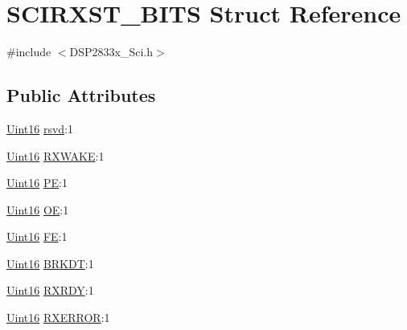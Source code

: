 \hypertarget{struct_s_c_i_r_x_s_t___b_i_t_s}{}\section{S\+C\+I\+R\+X\+S\+T\+\_\+\+B\+I\+T\+S Struct Reference}
\label{struct_s_c_i_r_x_s_t___b_i_t_s}


{\ttfamily \#include $<$D\+S\+P2833x\+\_\+\+Sci.\+h$>$}

\subsection*{Public Attributes}
\begin{DoxyCompactItemize}
\item 
\hyperlink{_d_s_p2833x___device_8h_a59a9f6be4562c327cbfb4f7e8e18f08b}{Uint16} \hyperlink{struct_s_c_i_r_x_s_t___b_i_t_s_a94e41dd6ba5e5be3d63c52db6e9a5fa5}{rsvd}\+:1
\item 
\hyperlink{_d_s_p2833x___device_8h_a59a9f6be4562c327cbfb4f7e8e18f08b}{Uint16} \hyperlink{struct_s_c_i_r_x_s_t___b_i_t_s_a924f49b75a354701a7b1aa0914b727dd}{R\+X\+W\+A\+K\+E}\+:1
\item 
\hyperlink{_d_s_p2833x___device_8h_a59a9f6be4562c327cbfb4f7e8e18f08b}{Uint16} \hyperlink{struct_s_c_i_r_x_s_t___b_i_t_s_a073eb89f2348c361ea8411127510f6ee}{P\+E}\+:1
\item 
\hyperlink{_d_s_p2833x___device_8h_a59a9f6be4562c327cbfb4f7e8e18f08b}{Uint16} \hyperlink{struct_s_c_i_r_x_s_t___b_i_t_s_aff0f70440e0c71c2de5fc2c937f11b83}{O\+E}\+:1
\item 
\hyperlink{_d_s_p2833x___device_8h_a59a9f6be4562c327cbfb4f7e8e18f08b}{Uint16} \hyperlink{struct_s_c_i_r_x_s_t___b_i_t_s_aced19690707a651351d981abb21bf510}{F\+E}\+:1
\item 
\hyperlink{_d_s_p2833x___device_8h_a59a9f6be4562c327cbfb4f7e8e18f08b}{Uint16} \hyperlink{struct_s_c_i_r_x_s_t___b_i_t_s_ab3f2cd112a18adfd3242f5cb550fea60}{B\+R\+K\+D\+T}\+:1
\item 
\hyperlink{_d_s_p2833x___device_8h_a59a9f6be4562c327cbfb4f7e8e18f08b}{Uint16} \hyperlink{struct_s_c_i_r_x_s_t___b_i_t_s_a8a137e6a747464d144dc0a6a39f42143}{R\+X\+R\+D\+Y}\+:1
\item 
\hyperlink{_d_s_p2833x___device_8h_a59a9f6be4562c327cbfb4f7e8e18f08b}{Uint16} \hyperlink{struct_s_c_i_r_x_s_t___b_i_t_s_a2bd58567c90a377aa8f7261f7fe35275}{R\+X\+E\+R\+R\+O\+R}\+:1
\end{DoxyCompactItemize}


